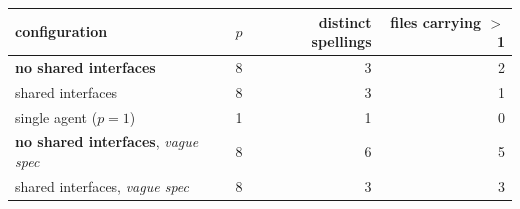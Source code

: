 \begin{tabular}{lrrr}
\toprule
configuration & $p$ & distinct spellings & files carrying $>$1 \\
\midrule
\textbf{no shared interfaces} & 8 & 3 & 2 \\
shared interfaces & 8 & 3 & 1 \\
single agent ($p{=}1$) & 1 & 1 & 0 \\
\textbf{no shared interfaces}, \emph{vague spec} & 8 & 6 & 5 \\
shared interfaces, \emph{vague spec} & 8 & 3 & 3 \\
\bottomrule
\end{tabular}
